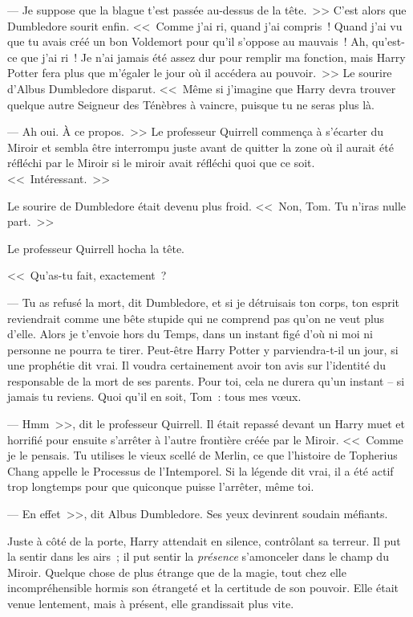 --- Je suppose que la blague t'est passée au-dessus de la tête.~>> C'est alors que Dumbledore sourit enfin. <<~Comme j'ai ri, quand j'ai compris~! Quand j'ai vu que tu avais créé un bon Voldemort pour qu'il s'oppose au mauvais~! Ah, qu'est-ce que j'ai ri~! Je n'ai jamais été assez dur pour remplir ma fonction, mais Harry Potter fera plus que m'égaler le jour où il accédera au pouvoir.~>> Le sourire d'Albus Dumbledore disparut. <<~Même si j'imagine que Harry devra trouver quelque autre Seigneur des Ténèbres à vaincre, puisque tu ne seras plus là.

--- Ah oui. À ce propos.~>> Le professeur Quirrell commença à s'écarter du Miroir et sembla être interrompu juste avant de quitter la zone où il aurait été réfléchi par le Miroir si le miroir avait réfléchi quoi que ce soit. <<~Intéressant.~>>

Le sourire de Dumbledore était devenu plus froid. <<~Non, Tom. Tu n'iras nulle part.~>>

Le professeur Quirrell hocha la tête.

<<~Qu'as-tu fait, exactement~?

--- Tu as refusé la mort, dit Dumbledore, et si je détruisais ton corps, ton esprit reviendrait comme une bête stupide qui ne comprend pas qu'on ne veut plus d'elle. Alors je t'envoie hors du Temps, dans un instant figé d'où ni moi ni personne ne pourra te tirer. Peut-être Harry Potter y parviendra-t-il un jour, si une prophétie dit vrai. Il voudra certainement avoir ton avis sur l'identité du responsable de la mort de ses parents. Pour toi, cela ne durera qu'un instant -- si jamais tu reviens. Quoi qu'il en soit, Tom~: tous mes vœux.

--- Hmm~>>, dit le professeur Quirrell. Il était repassé devant un Harry muet et horrifié pour ensuite s'arrêter à l'autre frontière créée par le Miroir. <<~Comme je le pensais. Tu utilises le vieux scellé de Merlin, ce que l'histoire de Topherius Chang appelle le Processus de l'Intemporel. Si la légende dit vrai, il a été actif trop longtemps pour que quiconque puisse l'arrêter, même toi.

--- En effet~>>, dit Albus Dumbledore. Ses yeux devinrent soudain méfiants.

Juste à côté de la porte, Harry attendait en silence, contrôlant sa terreur. Il put la sentir dans les airs~; il put sentir la \emph{présence} s'amonceler dans le champ du Miroir. Quelque chose de plus étrange que de la magie, tout chez elle incompréhensible hormis son étrangeté et la certitude de son pouvoir. Elle était venue lentement, mais à présent, elle grandissait plus vite.

